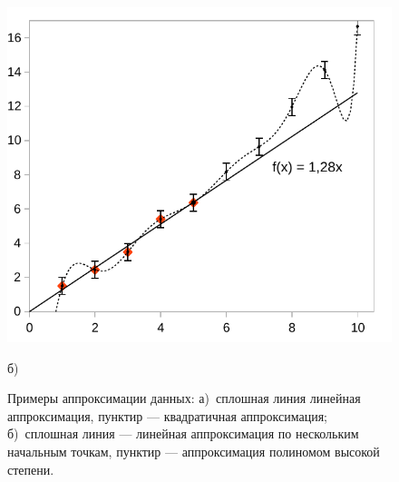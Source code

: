 \begin{figure}[h]
\begin{minipage}[t]{0.49\columnwidth}
\begin{center}
\includegraphics[width=1\linewidth]{images/x2b.pdf}
\par\end{center}
\begin{center}
б)
\par\end{center}%
\end{minipage}

\caption{\label{fig:approx}Примеры аппроксимации данных: а)~сплошная линия
\textendash{} линейная аппроксимация, пунктир --- квадратичная
аппроксимация; б)~сплошная линия --- линейная аппроксимация
по нескольким начальным точкам, пунктир --- аппроксимация
полиномом высокой степени.}
\end{figure}

